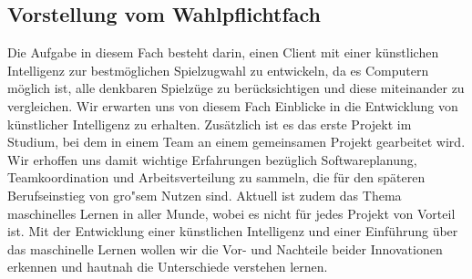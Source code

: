 \subsection{Vorstellung vom Wahlpflichtfach}\label{subsec:vorstellung-vom-wahlpflichtfach}
Die Aufgabe in diesem Fach besteht darin, einen Client mit einer k\"unstlichen Intelligenz zur bestm\"oglichen Spielzugwahl zu entwickeln, da es Computern m\"oglich ist, alle denkbaren Spielz\"uge zu ber\"ucksichtigen und diese miteinander zu vergleichen.
Wir erwarten uns von diesem Fach Einblicke in die Entwicklung von k\"unstlicher Intelligenz zu erhalten.
Zus\"atzlich ist es das erste Projekt im Studium, bei dem in einem Team an einem gemeinsamen Projekt gearbeitet wird.
Wir erhoffen uns damit wichtige Erfahrungen bez\"uglich Softwareplanung, Teamkoordination und Arbeitsverteilung zu sammeln, die f\"ur den sp\"ateren Berufseinstieg von gro"sem Nutzen sind.
Aktuell ist zudem das Thema maschinelles Lernen in aller Munde, wobei es nicht f\"ur jedes Projekt von Vorteil ist.
Mit der Entwicklung einer k\"unstlichen Intelligenz und einer Einf\"uhrung \"uber das maschinelle Lernen wollen wir die Vor- und Nachteile beider Innovationen erkennen und hautnah die Unterschiede verstehen lernen.


\bigskip
\newpage